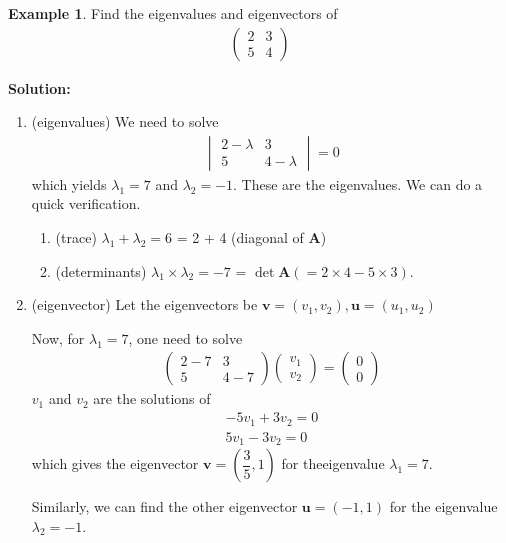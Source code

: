 \documentclass[11pt,a4paper]{book}
\theoremstyle{definition}\newtheorem{definition}{Definition}
\theoremstyle{definition}\newtheorem{fact}{Fact}
\theoremstyle{definition}\newtheorem{remark}{Remark}
\theoremstyle{definition}\newtheorem{ex}{Ex.}
\theoremstyle{definition}\newtheorem{project}{Project}
\theoremstyle{definition}\newtheorem{problem}{Problem}
\theoremstyle{definition}\newtheorem{example}{Example}
\numberwithin{theorem}{section}
\numberwithin{corollary}{chapter}
\numberwithin{assumption}{chapter}
\numberwithin{definition}{chapter}
\numberwithin{prop}{chapter}
\numberwithin{notation}{chapter}
\numberwithin{problem}{chapter}
\numberwithin{example}{chapter}
\numberwithin{fact}{chapter}
\numberwithin{ex}{chapter}
\def\A{\mathbf A}
\def\u{\mathbf u}
\def\v{\mathbf v}
\begin{document}
	\begin{example}	
		Find the eigenvalues and eigenvectors of 
		\begin{align*}
			\begin{pmatrix}
				2 & 3 \\ 5 & 4
			\end{pmatrix}
		\end{align*}
		
		\textbf{Solution:}
		\begin{enumerate}
		\item (eigenvalues) We need to solve
		\begin{align*}
			\begin{vmatrix}
				2 - \lambda & 3 \\ 5 & 4-\lambda
			\end{vmatrix} = 0
		\end{align*}
		which yields $\lambda_1 = 7$ and $\lambda_2 = -1$. 
		These are the eigenvalues. We can do a quick verification.
		\begin{enumerate}
			\item (trace) $\lambda_1 + \lambda_2 = 6$ = 2 + 4 (diagonal of $\A$)
			\item (determinants) $\lambda_1 \times \lambda_2 = -7$ = $\det \A (=2\times 4 - 5\times 3)$.
		\end{enumerate}
		\item (eigenvector) Let the eigenvectors be $\v = (v_1, v_2), \u = (u_1, u_2)$ 
		
		Now, for $\lambda_1 = 7$, one need to solve
		\begin{align*}
			\begin{pmatrix}
				2-7 & 3 \\ 5 & 4- 7
			\end{pmatrix}
			\begin{pmatrix}
				v_1 \\ v_2
			\end{pmatrix} = \begin{pmatrix}
				0\\ 0
			\end{pmatrix}
		\end{align*}
		$v_1$ and $v_2$ are the solutions of
		\begin{align*}
			-5 v_1 + 3 v_2 = 0 \\
			5 v_1 - 3 v_2 = 0
		\end{align*}
		which gives the eigenvector $\v = \left( \dfrac{3}{5}, 1 \right)$ for theeigenvalue $\lambda_1 = 7$.
		
		Similarly, we can find the other eigenvector $\u = (-1,1)$ for the eigenvalue $\lambda_2 = -1$.
		\end{enumerate}
	\end{example}
	
\end{document}

